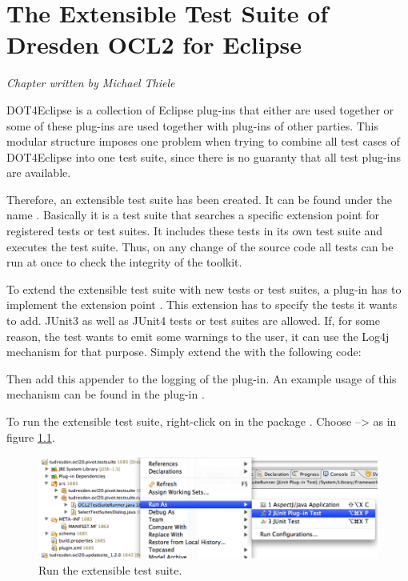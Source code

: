 \chapter{The Extensible Test Suite of Dresden OCL2 for Eclipse}
\label{chapter:generalTestSuite}

\begin{flushright}
\textit{Chapter written by Michael Thiele}
\end{flushright}

\acl{DOT4Eclipse} is a collection of Eclipse plug-ins that either are used together or some of these plug-ins are used together with plug-ins of other parties. This modular structure imposes one problem when trying to combine all test cases of \acl{DOT4Eclipse} into one test suite, since there is no guaranty that all test plug-ins are available.

Therefore, an extensible test suite has been created. It can be found under the name . Basically it is a test suite that searches a specific extension point for registered tests or test suites. It includes these tests in its own test suite and executes the test suite. Thus, on any change of the source code all tests can be run at once to check the integrity of the toolkit.

To extend the extensible test suite with new tests or test suites, a plug-in has to implement the extension point . This extension has to specify the tests it wants to add. JUnit3 as well as JUnit4 tests or test suites are allowed. If, for some reason, the test wants to emit some warnings to the user, it can use the Log4j mechanism for that purpose. Simply extend the  with the following code:


Then add this appender to the logging of the plug-in. An example usage of this mechanism can be found in the plug-in .

To run the extensible test suite, right-click on  in the package . Choose  --\textgreater {} as in figure \ref{pic:generalTestSuite:RunAs}.

\begin{figure}[!htbp]
	\centering
	\includegraphics[width=1.0\linewidth]{figures/generalTestSuite/RunAs}
	\caption{Run the extensible test suite.}
	\label{pic:generalTestSuite:RunAs}
\end{figure}
